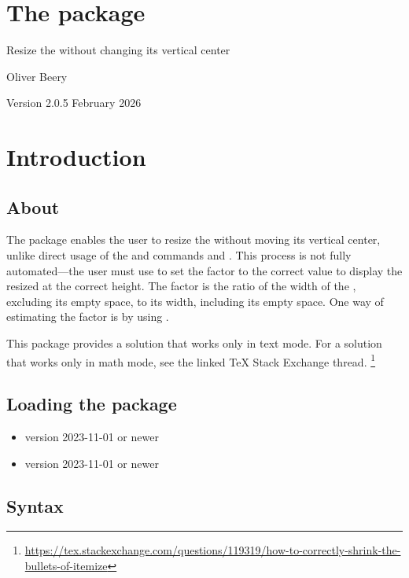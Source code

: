 \documentclass{beerydoc}
\begin{document}
\section*{The  package}

Resize the  without changing its vertical center

Oliver Beery

Version 2.0.5 February 2026


\section{Introduction}
\label{sec:intro}

\subsection{About}
\label{subsec:about}

The  package enables the user to resize the
 without moving its vertical center, unlike direct usage of the
\LaTeXe{} and  commands  and .
This process is not fully automated---the user must use
 to set the  factor to the correct value
to display the resized  at the correct height.
The  factor is the ratio of the width of the ,
excluding its empty space, to its width, including its empty space.
One way of estimating the  factor is by using
.

This package provides a solution that works only in text mode.
For a solution that works only in math mode, see the linked \TeX{} Stack
Exchange thread.%
\footnote{\url{https://tex.stackexchange.com/questions/119319/how-to-correctly-shrink-the-bullets-of-itemize}}

\subsection{Loading the package}
\label{subsec:loading}

\begin{itemize}
  \item \LaTeXe{} version 2023-11-01 or newer
  \item {} version 2023-11-01 or newer
\end{itemize}

\subsection{Syntax}
\label{subsec:syntax}
\end{document}

